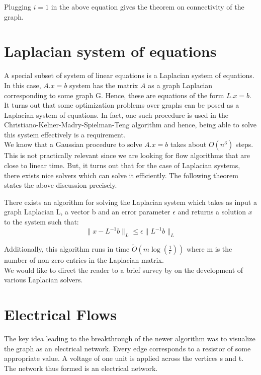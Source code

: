 \documentclass[BTech]{iitmdiss}
\begin{document}
		Plugging $i=1$ in the above equation gives the theorem on connectivity of the graph. \\
		
		\section{Laplacian system of equations}
		  A special subset of system of linear equations is a Laplacian system of equations. In this case, $A.x = b$ system has the matrix 
		  $A$ as a graph Laplacian corresponding to some graph G. Hence, these are equations of the form $L.x = b$. It turns out that some 
		  optimization problems over graphs can be posed as a Laplacian system of equations. In fact, one such procedure is used in the 
		  Christiano-Kelner-Madry-Spielman-Teng algorithm and hence, being able to solve this system effectively is a requirement. \\
		  
		  We know that a Gaussian procedure to solve $A.x = b$ takes about $O(n^3)$ steps. This is not practically relevant since we are 
		  looking for flow algorithms that are close to linear time. But, it turns out that for the case of Laplacian systems, there exists 
		  nice solvers which can solve it efficiently. The following theorem states the above discussion precisely. \\
		  
		  \begin{thm}
		    There exists an algorithm for solving the Laplacian system which takes as input a graph Laplacian L, a vector b and an error parameter
		    $\epsilon$ and returns a solution $x$ to the system such that:
		    $$\|x - L^{-1}b \|_L \leq \epsilon \|L^{-1}b\|_L$$
		  \end{thm}
		    
		    Additionally, this algorithm runs in time $\tilde{O}(m \log(\frac{1}{\epsilon}))$ where m is the number of non-zero entries in the 
		    Laplacian matrix. \\
		    
		    We would like to direct the reader to a brief survey by \cite{olivia} on the development of various 
		    Laplacian solvers.
		    
		    \section{Electrical Flows}
		      The key idea leading to the breakthrough of the newer algorithm was to visualize the graph as an electrical network. Every
		      edge corresponds to a resistor of some appropriate value. A voltage of
		      one unit is applied across the vertices s and t. The network thus formed is an electrical network. \\
		      
\end{document}

